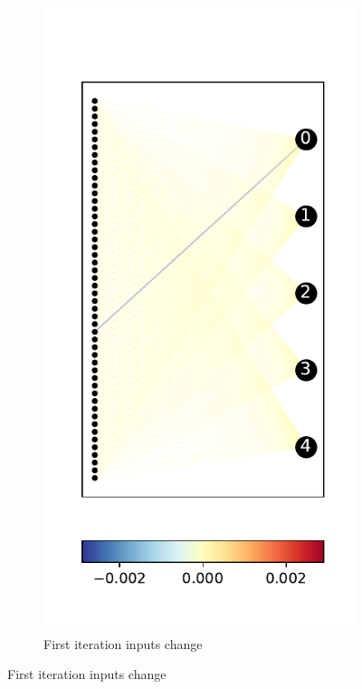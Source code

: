 \documentclass{easychair}
\begin{document}
\begin{figure}
\centering
\begin{subfigure}{0.2\linewidth}
  \includegraphics[width=\linewidth]{./images/ACASXU_2_9_1_vals.pdf}
  \caption{First iteration inputs change}

\end{subfigure}
\end{figure}
\end{document}
